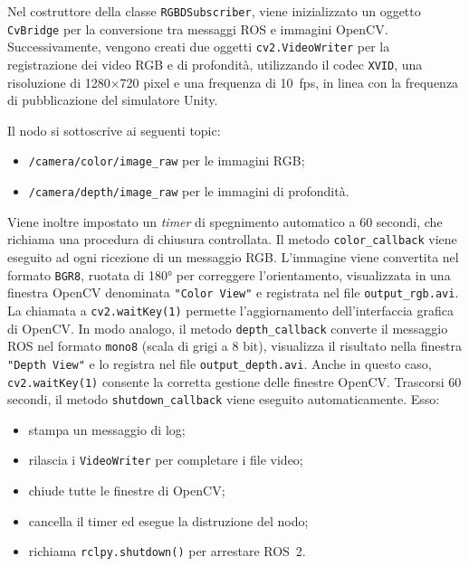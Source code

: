 \documentclass[11pt]{report}
\begin{document}
Nel costruttore della classe \texttt{RGBDSubscriber}, viene inizializzato un oggetto \texttt{CvBridge} per la conversione tra messaggi ROS e immagini OpenCV. Successivamente, vengono creati due oggetti \texttt{cv2.VideoWriter} per la registrazione dei video RGB e di profondità, utilizzando il codec \texttt{XVID}, una risoluzione di 1280$\times$720 pixel e una frequenza di 10~fps, in linea con la frequenza di pubblicazione del simulatore Unity.

Il nodo si sottoscrive ai seguenti topic:
\begin{itemize}
  \item \texttt{/camera/color/image\_raw} per le immagini RGB;
  \item \texttt{/camera/depth/image\_raw} per le immagini di profondità.
\end{itemize}

Viene inoltre impostato un \textit{timer} di spegnimento automatico a 60 secondi, che richiama una procedura di chiusura controllata.
\newline
Il metodo \texttt{color\_callback} viene eseguito ad ogni ricezione di un messaggio RGB. L’immagine viene convertita nel formato \texttt{BGR8}, ruotata di 180° per correggere l’orientamento, visualizzata in una finestra OpenCV denominata \texttt{"Color View"} e registrata nel file \texttt{output\_rgb.avi}. La chiamata a \texttt{cv2.waitKey(1)} permette l’aggiornamento dell’interfaccia grafica di OpenCV.
\newline
In modo analogo, il metodo \texttt{depth\_callback} converte il messaggio ROS nel formato \texttt{mono8} (scala di grigi a 8 bit), visualizza il risultato nella finestra \texttt{"Depth View"} e lo registra nel file \texttt{output\_depth.avi}. Anche in questo caso, \texttt{cv2.waitKey(1)} consente la corretta gestione delle finestre OpenCV.
\newline
Trascorsi 60 secondi, il metodo \texttt{shutdown\_callback} viene eseguito automaticamente. Esso:
\begin{itemize}
  \item stampa un messaggio di log;
  \item rilascia i \texttt{VideoWriter} per completare i file video;
  \item chiude tutte le finestre di OpenCV;
  \item cancella il timer ed esegue la distruzione del nodo;
  \item richiama \texttt{rclpy.shutdown()} per arrestare ROS~2.
\end{itemize}
\end{document}
